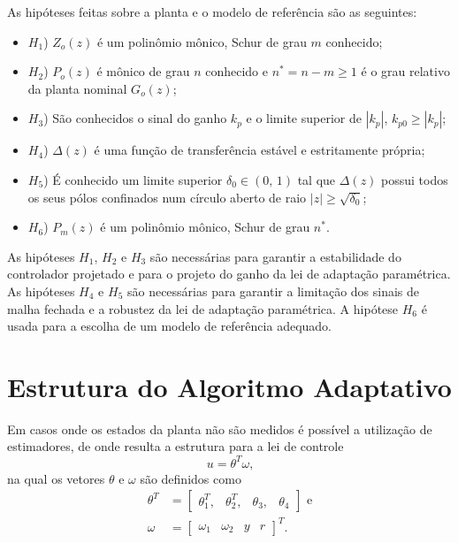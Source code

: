    As hipóteses feitas sobre a planta e o modelo de referência são as seguintes:

    \begin{itemize}
        \item[] $H_1$) $Z_o(z)$ é um polinômio mônico, Schur de grau $m$ conhecido;
        \item[] $H_2$) $P_o(z)$ é mônico de grau $n$ conhecido e $n^* = n - m \geq 1$ é o grau
            relativo da planta nominal $G_o(z)$;
        \item[] $H_3$) São conhecidos o sinal do ganho $k_p$ e o limite superior de $|k_p|$,
            $k_{p0} \geq |k_p|$;
        \item[] $H_4$) $\Delta(z)$ é uma função de transferência estável e estritamente
            própria;
        \item[] $H_5$) É conhecido um limite superior $\delta_0 \in (0, \, 1)$ tal que
            $\Delta(z)$ possui todos os seus pólos confinados num círculo aberto de
            raio $|z| \geq \sqrt{\delta_0}$;
        \item[] $H_6$) $P_m(z)$ é um polinômio mônico, Schur de grau $n^*$.
    \end{itemize}

    As hipóteses $H_1$, $H_2$ e $H_3$ são necessárias para garantir a estabilidade do
    controlador projetado e para o projeto do ganho da lei de adaptação paramétrica.
    As hipóteses $H_4$ e $H_5$ são necessárias para garantir a limitação dos sinais
    de malha fechada e a robustez da lei de adaptação paramétrica. A hipótese $H_6$
    é usada para a escolha de um modelo de referência adequado.

\section{Estrutura do Algoritmo Adaptativo}

    Em casos onde os estados da planta não são medidos é possível a utilização de
    estimadores, de onde resulta a estrutura para a lei de
    controle~\cite{ref:TAO}
    \begin{equation}
        u = \theta^T \omega\text{,}
    \end{equation}
    na qual os vetores $\theta$ e $\omega$ são definidos como
    \begin{equation}
        \begin{split}
            \theta^T & = \left[ \begin{matrix} \theta_1^T, & \theta_2^T, & \theta_3, & \theta_4
                \end{matrix} \right]\text{ e}\\
            \omega & = {\left[ \begin{matrix} \omega_1 & \omega_2 & y & r \end{matrix}
                \right]}^T\text{.}
        \end{split}
    \end{equation}

